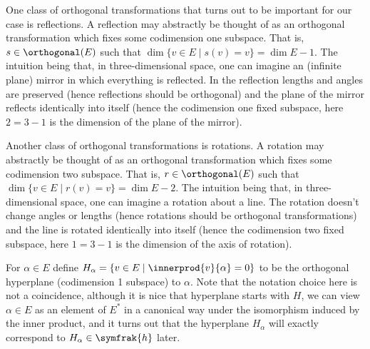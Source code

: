 \documentclass[fleqn]{NotesClass}
\newcommand{\csa}{\symfrak{h}}
\begin{document}
    One class of orthogonal transformations that turns out to be important for our case is reflections.
    A reflection may abstractly be thought of as an orthogonal transformation which fixes some codimension one subspace.
    That is, \(s \in \orthogonal(E)\) such that \(\dim \{v \in E \mid s(v) = v\} = \dim E - 1\).
    The intuition being that, in three-dimensional space, one can imagine an (infinite plane) mirror in which everything is reflected.
    In the reflection lengths and angles are preserved (hence reflections should be orthogonal) and the plane of the mirror reflects identically into itself (hence the codimension one fixed subspace, here \(2 = 3 - 1\) is the dimension of the plane of the mirror).
    
    Another class of orthogonal transformations is rotations.
    A rotation may abstractly be thought of as an orthogonal transformation which fixes some codimension two subspace.
    That is, \(r \in \orthogonal(E)\) such that \(\dim \{v \in E \mid r(v) = v\} = \dim E - 2\).
    The intuition being that, in three-dimensional space, one can imagine a rotation about a line.
    The rotation doesn't change angles or lengths (hence rotations should be orthogonal transformations) and the line is rotated identically into itself (hence the codimension two fixed subspace, here \(1 = 3 - 1\) is the dimension of the axis of rotation).
    
    For \(\alpha \in E\) define \(H_\alpha = \{v \in E \mid \innerprod{v}{\alpha} = 0\}\) to be the orthogonal hyperplane (codimension 1 subspace) to \(\alpha\).
    Note that the notation choice here is not a coincidence, although it is nice that hyperplane starts with \(H\), we can view \(\alpha \in E\) as an element of \(E^*\) in a canonical way under the isomorphism induced by the inner product, and it turns out that the hyperplane \(H_\alpha\) will exactly correspond to \(H_\alpha \in \csa\) later.
    
\end{document}
